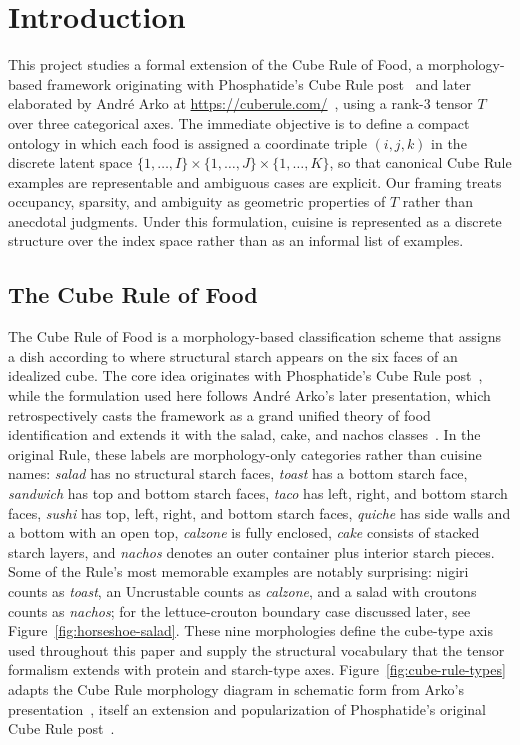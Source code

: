 \section{Introduction}

This project studies a formal extension of the Cube Rule of Food, a morphology-based framework originating with Phosphatide's Cube Rule post~\cite{phosphatide_gutfi} and later elaborated by André Arko at \url{https://cuberule.com/}~\cite{arko_cube_rule_food}, using a rank-3 tensor $T$ over three categorical axes.
The immediate objective is to define a compact ontology in which each food is assigned a coordinate triple $(i,j,k)$ in the discrete latent space $\{1,\ldots,I\} \times \{1,\ldots,J\} \times \{1,\ldots,K\}$, so that canonical Cube Rule examples are representable and ambiguous cases are explicit.
Our framing treats occupancy, sparsity, and ambiguity as geometric properties of $T$ rather than anecdotal judgments.
Under this formulation, cuisine is represented as a discrete structure over the index space rather than as an informal list of examples.

\subsection{The Cube Rule of Food}

The Cube Rule of Food is a morphology-based classification scheme that assigns a dish according to where structural starch appears on the six faces of an idealized cube. The core idea originates with Phosphatide's Cube Rule post~\cite{phosphatide_gutfi}, while the formulation used here follows André Arko's later presentation, which retrospectively casts the framework as a grand unified theory of food identification and extends it with the salad, cake, and nachos classes~\cite{arko_cube_rule_food}.
In the original Rule, these labels are morphology-only categories rather than cuisine names: \emph{salad} has no structural starch faces, \emph{toast} has a bottom starch face, \emph{sandwich} has top and bottom starch faces, \emph{taco} has left, right, and bottom starch faces, \emph{sushi} has top, left, right, and bottom starch faces, \emph{quiche} has side walls and a bottom with an open top, \emph{calzone} is fully enclosed, \emph{cake} consists of stacked starch layers, and \emph{nachos} denotes an outer container plus interior starch pieces.
Some of the Rule's most memorable examples are notably surprising: nigiri counts as \emph{toast}, an Uncrustable counts as \emph{calzone}, and a salad with croutons counts as \emph{nachos}; for the lettuce-crouton boundary case discussed later, see Figure~\ref{fig:horseshoe-salad}.
These nine morphologies define the cube-type axis used throughout this paper and supply the structural vocabulary that the tensor formalism extends with protein and starch-type axes.
Figure~\ref{fig:cube-rule-types} adapts the Cube Rule morphology diagram in schematic form from Arko's presentation~\cite{arko_cube_rule_food}, itself an extension and popularization of Phosphatide's original Cube Rule post~\cite{phosphatide_gutfi}.

